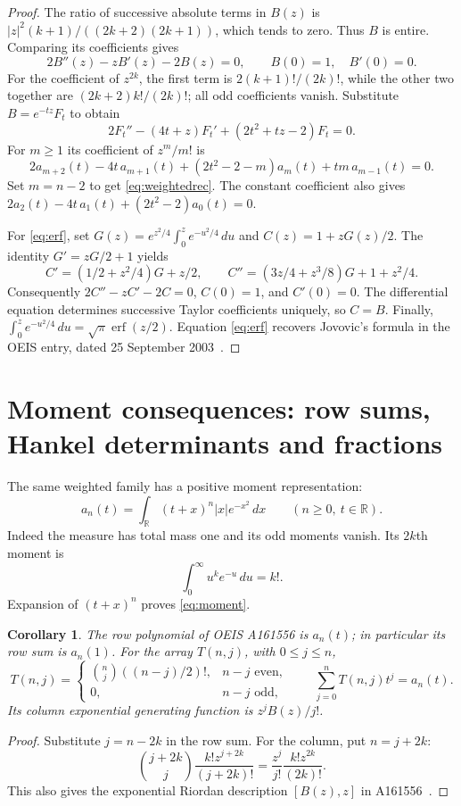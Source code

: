 \documentclass[11pt]{article}
\newtheorem{corollary}[theorem]{Corollary}
\begin{document}
\begin{proof}
The ratio of successive absolute terms in $B(z)$ is
$|z|^2(k+1)/((2k+2)(2k+1))$, which tends to zero. Thus $B$ is entire.
Comparing its coefficients gives
\begin{equation}\label{eq:Bode}
 2B''(z)-zB'(z)-2B(z)=0,\qquad B(0)=1,\quad B'(0)=0.
\end{equation}
For the coefficient of $z^{2k}$, the first term is
$2(k+1)!/(2k)!$, while the other two together are
$(2k+2)k!/(2k)!$; all odd coefficients vanish.
Substitute $B=e^{-tz}F_t$ to obtain
\[
 2F_t''-(4t+z)F_t'+(2t^2+tz-2)F_t=0.
\]
For $m\geq1$ its coefficient of $z^m/m!$ is
\[
 2a_{m+2}(t)-4t\,a_{m+1}(t)+(2t^2-2-m)a_m(t)
       +tm\,a_{m-1}(t)=0.
\]
Set $m=n-2$ to get \eqref{eq:weightedrec}. The constant coefficient
also gives $2a_2(t)-4t\,a_1(t)+(2t^2-2)a_0(t)=0$.

For \eqref{eq:erf}, set
$G(z)=e^{z^2/4}\int_0^z e^{-u^2/4}\,du$ and $C(z)=1+zG(z)/2$.
The identity $G'=zG/2+1$ yields
\[
 C'=(1/2+z^2/4)G+z/2,\qquad
 C''=(3z/4+z^3/8)G+1+z^2/4.
\]
Consequently $2C''-zC'-2C=0$, $C(0)=1$, and $C'(0)=0$.
The differential equation determines successive Taylor coefficients
uniquely, so $C=B$. Finally,
$\int_0^z e^{-u^2/4}\,du=\sqrt\pi\operatorname{erf}(z/2)$.
Equation \eqref{eq:erf} recovers Jovovic's formula in the OEIS entry,
dated 25 September 2003~\cite{oeis}.
\end{proof}

\section{Moment consequences: row sums, Hankel determinants and fractions}
The same weighted family has a positive moment representation:
\begin{equation}\label{eq:moment}
 a_n(t)=\int_{\mathbb R}(t+x)^n|x|e^{-x^2}\,dx
 \qquad(n\geq0,\ t\in\mathbb R).
\end{equation}
Indeed the measure has total mass one and its odd moments vanish.
Its $2k$th moment is
\[
 \int_0^\infty u^ke^{-u}\,du=k!.
\]
Expansion of $(t+x)^n$ proves \eqref{eq:moment}.

\begin{corollary}\label{cor:triangle}
The row polynomial of OEIS A161556 is $a_n(t)$; in particular its row
sum is $a_n(1)$. For the array $T(n,j)$, with $0\leq j\leq n$,
\[
 T(n,j)=\begin{cases}\binom nj((n-j)/2)!,&n-j\text{ even},\\
 0,&n-j\text{ odd},\end{cases}\qquad
 \sum_{j=0}^n T(n,j)t^j=a_n(t).
\]
Its column exponential generating function is $z^jB(z)/j!$.
\end{corollary}
\begin{proof}
Substitute $j=n-2k$ in the row sum. For the column, put $n=j+2k$:
\[
 \binom{j+2k}{j}\frac{k!z^{j+2k}}{(j+2k)!}
 =\frac{z^j}{j!}\frac{k!z^{2k}}{(2k)!}.
\]
This also gives the exponential Riordan description $[B(z),z]$
in A161556~\cite{oeis-triangle}.
\end{proof}
\end{document}
